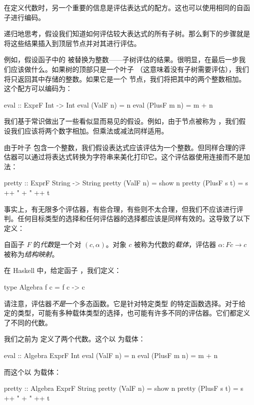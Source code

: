\documentclass[DaoFP]{subfiles}
\begin{document}
在定义代数时，另一个重要的信息是评估表达式的配方。这也可以使用相同的自函子进行编码。

递归地思考，假设我们知道如何评估较大表达式的所有子树。那么剩下的步骤就是将这些结果插入到顶层节点并对其进行评估。

例如，假设函子中的  被替换为整数——子树评估的结果。很明显，在最后一步我们应该做什么。如果树的顶部只是一个叶子 （这意味着没有子树需要评估），我们将只返回其中存储的整数。如果它是一个  节点，我们将把其中的两个整数相加。这个配方可以编码为：
\begin{haskell}
eval :: ExprF Int -> Int
eval (ValF n)    = n
eval (PlusF m n) = m + n
\end{haskell}

我们基于常识做出了一些看似显而易见的假设。例如，由于节点被称为 ，我们假设我们应该将两个数字相加。但乘法或减法同样适用。

由于叶子  包含一个整数，我们假设表达式应该评估为一个整数。但同样合理的评估器可以通过将表达式转换为字符串来美化打印它。这个评估器使用连接而不是加法：
\begin{haskell}
pretty :: ExprF String -> String
pretty (ValF n)    = show n
pretty (PlusF s t) = s ++ " + " ++ t
\end{haskell}

事实上，有无限多个评估器，有些合理，有些则不太合理，但我们不应该进行评判。任何目标类型的选择和任何评估器的选择都应该是同样有效的。这导致了以下定义：

自函子 $F$ 的\emph{代数}是一个对 $(c, \alpha)$。对象 $c$ 被称为代数的\emph{载体}，评估器 $\alpha \colon F c \to c$ 被称为\emph{结构映射}。

在 Haskell 中，给定函子 ，我们定义：
\begin{haskell}
type Algebra f c = f c -> c
\end{haskell}

请注意，评估器\emph{不是}一个多态函数。它是针对特定类型  的特定函数选择。对于给定的类型，可能有多种载体类型的选择，也可能有许多不同的评估器。它们都定义了不同的代数。

我们之前为  定义了两个代数。这个以  为载体：
\begin{haskell}
eval :: Algebra ExprF Int
eval (ValF n)   = n
eval (PlusF m n) = m + n
\end{haskell}
而这个以  为载体：
\begin{haskell}
pretty :: Algebra ExprF String
pretty (ValF n)   = show n
pretty (PlusF s t) = s ++ " + " ++ t
\end{haskell}
\end{document}
